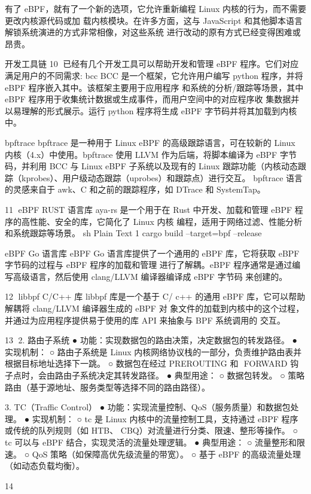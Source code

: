 有了 eBPF，就有了一个新的选项，它允许重新编程 Linux 内核的行为，而不需要更改内核源代码或加
载内核模块。在许多方面，这与 JavaScript 和其他脚本语言解锁系统演进的方式非常相像，对这些系统
进行改动的原有方式已经变得困难或昂贵。

开发工具链
                                                         10
已经有几个开发工具可以帮助开发和管理 eBPF 程序。它们对应满足用户的不同需求:
bcc
BCC 是一个框架，它允许用户编写 python 程序，并将 eBPF 程序嵌入其中。该框架主要用于应用程序
和系统的分析/跟踪等场景，其中 eBPF 程序用于收集统计数据或生成事件，而用户空间中的对应程序收
集数据并以易理解的形式展示。运行 python 程序将生成 eBPF 字节码并将其加载到内核中。




bpftrace
bpftrace 是一种用于 Linux eBPF 的高级跟踪语言，可在较新的 Linux 内核（4.x）中使用。bpftrace
使用 LLVM 作为后端，将脚本编译为 eBPF 字节码，并利用 BCC 与 Linux eBPF 子系统以及现有的
Linux 跟踪功能（内核动态跟踪（kprobes）、用户级动态跟踪（uprobes）和跟踪点）进行交互。
bpftrace 语言的灵感来自于 awk、C 和之前的跟踪程序，如 DTrace 和 SystemTap。




                                                                    11
eBPF RUST 语言库
aya-rs 是一个用于在 Rust 中开发、加载和管理 eBPF 程序的高性能、安全的库，它简化了 Linux 内核
编程，适用于网络过滤、性能分析和系统跟踪等场景。
sh
                                                   Plain Text
 1   cargo build --target=bpf --release




eBPF Go 语言库
eBPF Go 语言库提供了一个通用的 eBPF 库，它将获取 eBPF 字节码的过程与 eBPF 程序的加载和管理
进行了解耦。eBPF 程序通常是通过编写高级语言，然后使用 clang/LLVM 编译器编译成 eBPF 字节码
来创建的。




                                                                12
libbpf C/C++ 库
libbpf 库是一个基于 C/ c++ 的通用 eBPF 库，它可以帮助解耦将 clang/LLVM 编译器生成的 eBPF 对
象文件的加载到内核中的这个过程，并通过为应用程序提供易于使用的库 API 来抽象与 BPF 系统调用的
交互。




                                                               13
2. 路由子系统
 ● 功能：实现数据包的路由决策，决定数据包的转发路径。
 ● 实现机制：
    ○ 路由子系统是 Linux 内核网络协议栈的一部分，负责维护路由表并根据目标地址选择下一跳。
    ○ 数据包在经过 ﻿PREROUTING﻿ 和 ﻿
                            FORWARD﻿ 钩子点时，会由路由子系统决定其转发路径。
 ● 典型用途：
    ○ 数据包转发。
    ○ 策略路由（基于源地址、服务类型等选择不同的路由路径）。



3. TC（Traffic Control）
 ● 功能：实现流量控制、QoS（服务质量）和数据包处理。
 ● 实现机制：
    ○ tc﻿ 是 Linux 内核中的流量控制工具，支持通过 eBPF 程序或传统的队列规则（如 HTB、
      CBQ）对流量进行分类、限速、整形等操作。
    ○ tc﻿ 可以与 eBPF 结合，实现灵活的流量处理逻辑。
 ● 典型用途：
    ○ 流量整形和限速。
    ○ QoS 策略（如保障高优先级流量的带宽）。
    ○ 基于 eBPF 的高级流量处理（如动态负载均衡）。




                                                           14
